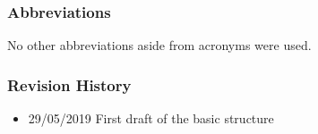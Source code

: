 \subsubsection{Abbreviations}
No other abbreviations aside from acronyms were used.
\subsubsection{Revision History}
\begin{itemize}
\item 29/05/2019 First draft of the basic structure
\end{itemize}
